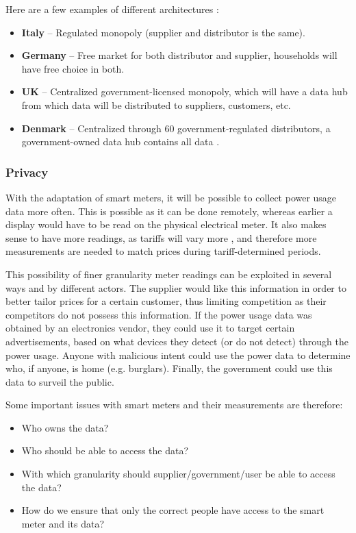 Here are a few examples of different architectures \cite{smart_meter_survey}:
\begin{itemize}
	\item \textbf{Italy} -- Regulated monopoly (supplier and distributor is the same).
	\item \textbf{Germany} -- Free market for both distributor and supplier, households will have free choice in both.
	\item \textbf{UK} -- Centralized government-licensed monopoly, which will have a data hub from which data will be distributed to suppliers, customers, etc.
	\item \textbf{Denmark} -- Centralized through 60 government-regulated distributors, a government-owned data hub contains all data \cite{dk_marked,LOV_nr_575_af_18-06-2012}.
\end{itemize}

\subsubsection{Privacy}
With the adaptation of smart meters, it will be possible to collect power usage data more often.
This is possible as it can be done remotely, whereas earlier a display would have to be read on the physical electrical meter.
It also makes sense to have more readings, as tariffs will vary more \cite{directive_2009_72_EC, eu_smart_meter_pricing}, and therefore more measurements are needed to match prices during tariff-determined periods.

This possibility of finer granularity meter readings can be exploited in several ways and by different actors.
The supplier would like this information in order to better tailor prices for a certain customer, thus limiting competition as their competitors do not possess this information.
If the power usage data was obtained by an electronics vendor, they could use it to target certain advertisements, based on what devices they detect (or do not detect) through the power usage.
Anyone with malicious intent could use the power data to determine who, if anyone, is home (e.g. burglars).
Finally, the government could use this data to surveil the public.

Some important issues with smart meters and their measurements are therefore:
\begin{itemize}
	\item Who owns the data?
	\item Who should be able to access the data?
	\item With which granularity should supplier/government/user be able to access the data?
	\item How do we ensure that only the correct people have access to the smart meter and its data?
\end{itemize}

